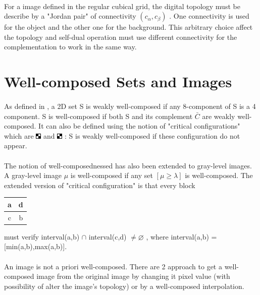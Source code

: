 \documentclass[12pt,a4paper]{report}
\begin{document}
\paragraph{}
For a image defined in the regular cubical grid, the digital topology must be describe by a "Jordan pair" of connectivity $(c_\alpha,c_\beta)$ \cite{Kong:1989:DTI:71397.71400}. One connectivity is used for the object and the other one for the background. This arbitrary choice affect the topology and self-dual operation must use different connectivity for the complementation to work in the same way.




\section{Well-composed Sets and Images}
\paragraph{}
As defined in \cite{Latecki95}, a 2D set S is weakly well-composed if any 8-component of S is a 4 component. S is well-composed if both S and its complement $\bar{C}$ are weakly well-composed. It can also be defined using the notion of "critical configurations" which are \includegraphics{confi1.jpg} and \includegraphics{confi2.jpg} : S is weakly well-composed if these configuration do not appear.
\paragraph{}
The notion of well-composednessed has also been extended to gray-level images. A gray-level image $\mu$ is well-composed if any set $[\mu \geq \lambda ]$ is well-composed. The extended version of "critical configuration" is that every block 
\begin{tabular}{|c|c|}
\hline 
a & d \\ 
\hline 
c & b \\ 
\hline 
\end{tabular} 
must verify interval(a,b) $\cap$ interval(c,d) $\neq \varnothing$ , where interval(a,b) = [min(a,b),max(a,b)].
\paragraph{}
An image is not a priori well-composed. There are 2 approach to get a well-composed image from the original image \cite{Geraud.15.ismm} by changing it pixel value (with possibility of alter the image's topology) or by a well-composed interpolation.
\end{document}
